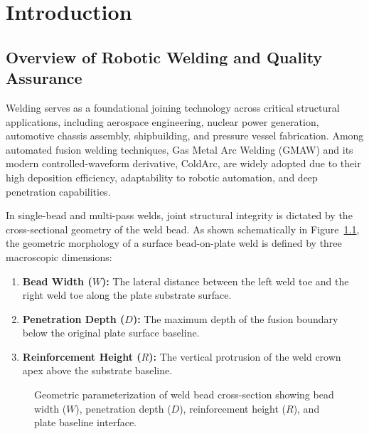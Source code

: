 \documentclass[12pt,a4paper,oneside]{report}
\begin{document}
\setcounter{page}{1}
\chapter{Introduction}
\label{ch:introduction}

\section{Overview of Robotic Welding and Quality Assurance}
Welding serves as a foundational joining technology across critical structural applications, including aerospace engineering, nuclear power generation, automotive chassis assembly, shipbuilding, and pressure vessel fabrication. Among automated fusion welding techniques, Gas Metal Arc Welding (GMAW) and its modern controlled-waveform derivative, ColdArc, are widely adopted due to their high deposition efficiency, adaptability to robotic automation, and deep penetration capabilities. 

In single-bead and multi-pass welds, joint structural integrity is dictated by the cross-sectional geometry of the weld bead. As shown schematically in Figure~\ref{fig:weld_geo_concept}, the geometric morphology of a surface bead-on-plate weld is defined by three macroscopic dimensions:
\begin{enumerate}
    \item \textbf{Bead Width ($W$):} The lateral distance between the left weld toe and the right weld toe along the plate substrate surface.
    \item \textbf{Penetration Depth ($D$):} The maximum depth of the fusion boundary below the original plate surface baseline.
    \item \textbf{Reinforcement Height ($R$):} The vertical protrusion of the weld crown apex above the substrate baseline.
\end{enumerate}

\begin{figure}[htbp]\centering
{}
\caption{Geometric parameterization of weld bead cross-section showing bead width ($W$), penetration depth ($D$), reinforcement height ($R$), and plate baseline interface.}\label{fig:weld_geo_concept}
\end{figure}
\end{document}
